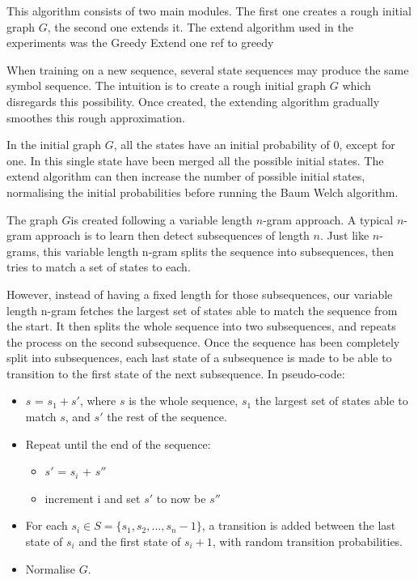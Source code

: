 \documentclass[
10pt, %
a4paper, %
oneside, %
headinclude,footinclude, %
BCOR5mm, %
]{scrartcl}
\title{\normalfont\spacedallcaps{Article Title}} %
\author{\spacedlowsmallcaps{John Smith* \& James Smith\textsuperscript{1}}} %
\date{} %
\begin{document}
This algorithm consists of two main modules. The first one creates a rough initial graph $G$, the second one extends it. The extend algorithm used in the experiments was the Greedy Extend one {ref to greedy}%

When training on a new sequence, several state sequences may produce the same symbol sequence. The intuition is to create a rough initial graph $G$ which disregards this possibility. Once created, the extending algorithm gradually smoothes this rough approximation.

In the initial graph $G$, all the states have an initial probability of 0, except for one. In this single state have been merged all the possible initial states. The extend algorithm can then increase the number of possible initial states, normalising the initial probabilities before running the Baum Welch algorithm.

The graph $G$is created following a variable length $n$-gram approach. A typical $n$-gram approach is to learn then detect subsequences of length $n$. Just like $n$-grams, this variable length n-gram splits the sequence into subsequences, then tries to match a set of states to each.

However, instead of having a fixed length for those subsequences, our variable length n-gram fetches the largest set of states able to match the sequence from the start. It then splits the whole sequence into two subsequences, and repeats the process on the second subsequence. Once the sequence has been completely split into subsequences, each last state of a subsequence is made to be able to transition to the first state of the next subsequence. In pseudo-code:

\begin{itemize}
	\item $s$ = $s_1 + s'$, where $s$ is the whole sequence, $s_1$ the largest set of states able to match $s$, and $s'$ the rest of the sequence.
	\item Repeat until the end of the sequence:
	\begin{itemize}
		\item $s'$ = $s_i$ + $s''$
		\item increment i and set $s'$ to now be $s''$
	\end{itemize}
	\item For each $s_i \in S = \{s_1, s_2, ... , s_n-1\}$, a transition is added between the last state of $s_i$ and the first state of $s_i+1$, with random transition probabilities.
	\item Normalise $G$.
\end{itemize}
\end{document}
